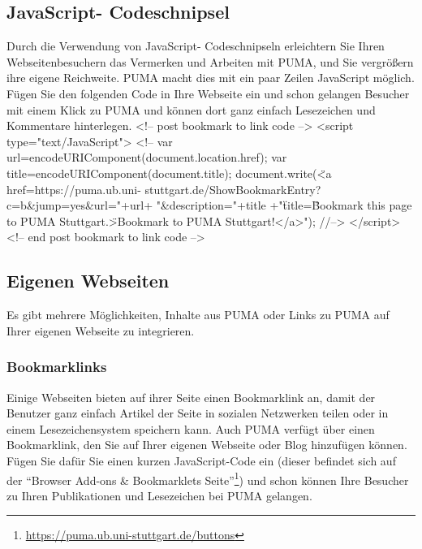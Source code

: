 \documentclass[b5paper,11pt,twoside]{scrbook} %
\begin{document}
\subsection{JavaScript- Codeschnipsel}
Durch die Verwendung von JavaScript- Codeschnipseln erleichtern Sie Ihren Webseitenbesuchern das Vermerken und Arbeiten mit PUMA, und Sie vergrößern ihre eigene Reichweite. PUMA macht dies mit ein paar Zeilen JavaScript möglich. Fügen Sie den folgenden Code in Ihre Webseite ein und schon gelangen Besucher mit einem Klick zu PUMA und können dort ganz einfach Lesezeichen und Kommentare hinterlegen.
\newline
\newline
<!-- post bookmark to link code -->\newline
      <script type="text/JavaScript">\newline
      <!--\newline
      var url=encodeURIComponent(document.location.href);\newline
      var title=encodeURIComponent(document.title);\newline
      document.write(\"<a href=https://puma.ub.uni-	stuttgart.de/ShowBookmarkEntry?c=b\&jump=yes\&url="+url+ "\&description="+title +"\" title=\"Bookmark this page to PUMA Stuttgart.\">Bookmark to PUMA Stuttgart!</a>");\newline%
      //-->\newline
      </script>\newline
      <!-- end post bookmark to link code -->\newline

\subsection{Eigenen Webseiten}
Es gibt mehrere Möglichkeiten, Inhalte aus PUMA oder Links zu PUMA auf Ihrer eigenen Webseite zu integrieren.

\subsubsection{Bookmarklinks}
Einige Webseiten bieten  auf ihrer Seite einen Bookmarklink an, damit der Benutzer ganz einfach Artikel der Seite in sozialen Netzwerken teilen oder in einem Lesezeichensystem speichern kann. 
\newline Auch PUMA verfügt über einen Bookmarklink, den Sie auf Ihrer eigenen Webseite oder Blog hinzufügen können. Fügen Sie dafür Sie einen kurzen JavaScript-Code ein (dieser befindet sich auf der \enquote{Browser Add-ons \& Bookmarklets Seite}\footnote{\url{https://puma.ub.uni-stuttgart.de/buttons}}) und schon können Ihre Besucher zu Ihren Publikationen und Lesezeichen bei PUMA gelangen.
\end{document}
